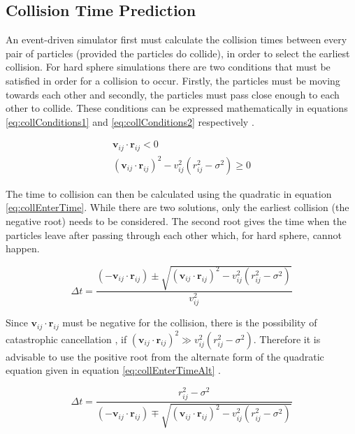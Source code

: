 \documentclass[12pt]{UoAthesis}
\begin{document}
\subsection{Collision Time Prediction}
An event-driven simulator first must calculate the collision times
between every pair of particles (provided the particles do collide),
in order to select the earliest collision.  For hard sphere
simulations there are two conditions that must be satisfied in order
for a collision to occur.  Firstly, the particles must be moving
towards each other and secondly, the particles must pass close enough
to each other to collide.  These conditions can be expressed
mathematically in equations \eqref{eq:collConditions1} and
\eqref{eq:collConditions2} respectively \cite{Haile1997}.

\begin{subequations}
  \begin{align}
    \mathbf{v}_{ij}\cdot\mathbf{r}_{ij} < 0 \label{eq:collConditions1}\\
    (\mathbf{v}_{ij}\cdot\mathbf{r}_{ij})^2 
    - v_{ij}^2(r_{ij}^2 - \sigma^2) \geq 0 \label{eq:collConditions2}
  \end{align}
\end{subequations}

The time to collision can then be calculated using the quadratic in
equation \eqref{eq:collEnterTime}.  While there are two solutions,
only the earliest collision (the negative root) needs to be
considered.  The second root gives the time when the particles leave
after passing through each other which, for hard sphere, cannot
happen.

\begin{equation}
\Delta t = \frac{(-\mathbf{v}_{ij}\cdot\mathbf{r}_{ij}) \pm 
  \sqrt{(\mathbf{v}_{ij}\cdot\mathbf{r}_{ij})^2 - v_{ij}^2(r_{ij}^2 - \sigma^2)}}
       {v_{ij}^2} \label{eq:collEnterTime}
\end{equation}

Since $\mathbf{v}_{ij}\cdot\mathbf{r}_{ij}$ must be negative for the
collision, there is the possibility of catastrophic cancellation
\cite{Goldberg1991}, if $(\mathbf{v}_{ij}\cdot\mathbf{r}_{ij})^2 \gg
v_{ij}^2(r_{ij}^2 - \sigma^2)$. Therefore it is advisable to use the
positive root from the alternate form of the quadratic equation given
in equation \eqref{eq:collEnterTimeAlt} \cite{Poschel2005}.

\begin{equation}
\Delta t = \frac{r_{ij}^2 - \sigma^2}{(-\mathbf{v}_{ij}\cdot\mathbf{r}_{ij})
  \mp \sqrt{(\mathbf{v}_{ij}\cdot\mathbf{r}_{ij})^2 
    - v_{ij}^2(r_{ij}^2 - \sigma^2)}}
\label{eq:collEnterTimeAlt}
\end{equation}
\end{document}
